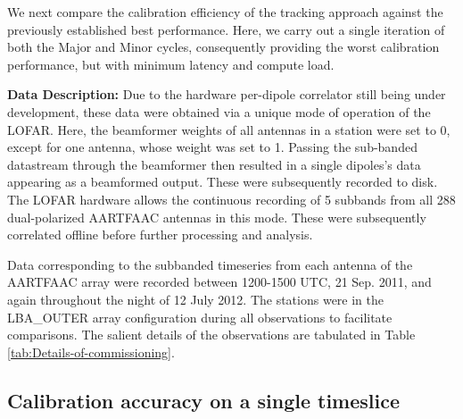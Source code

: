 \documentclass{aa}
\begin{document}
We next compare the calibration  efficiency of the tracking approach against the
previously established best  performance. Here, we carry out  a single iteration
of both the Major and Minor cycles, consequently providing the worst calibration
performance,   but  with   minimum  latency   and  compute   load.

\begin{table}[h]
\caption{Details of commissioning observations carried out with the AARTFAAC}
\label{tab:Details-of-commissioning}
\end{table}

\textbf{Data Description:} Due to the hardware per-dipole correlator still being
under development,  these data were obtained  via a unique mode  of operation of
the LOFAR. Here, the beamformer weights of all antennas in a station were set to
0, except  for one antenna, whose weight  was set to 1.   Passing the sub-banded
datastream  through the  beamformer then  resulted  in a  single dipoles's  data
appearing as a beamformed output. These were subsequently recorded to disk. The
LOFAR  hardware allows  the  continuous recording  of  5 subbands  from all  288
dual-polarized  AARTFAAC  antennas  in   this  mode.   These  were  subsequently
correlated offline before further processing and analysis.

Data corresponding to the subbanded timeseries from each antenna of the AARTFAAC
array were  recorded between 1200-1500 UTC,  21 Sep. 2011,  and again throughout
the  night  of  12  July  2012.   The stations  were  in  the  LBA\_OUTER  array
configuration during  all observations  to facilitate comparisons.   The salient
details     of      the     observations     are      tabulated     in     Table
\ref{tab:Details-of-commissioning}. 




\subsection{\label{sec:calib-accuracy}Calibration accuracy on a single timeslice}
\end{document}
